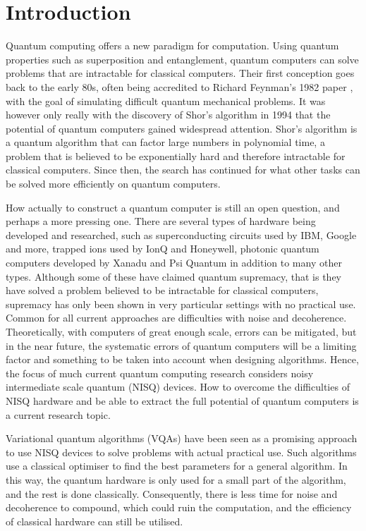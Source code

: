 \chapter{Introduction}
Quantum computing offers a new paradigm for computation.
Using quantum properties such as superposition and entanglement, quantum computers can solve problems that are intractable for classical computers.
Their first conception goes back to the early 80s, often being accredited to Richard Feynman's 1982 paper \cite{feynman1982}, with the goal of simulating difficult quantum mechanical problems.
It was however only really with the discovery of Shor's algorithm in 1994 \cite{shor1994} that the potential of quantum computers gained widespread attention.
Shor's algorithm is a quantum algorithm that can factor large numbers in polynomial time, a problem that is believed to be exponentially hard and therefore intractable for classical computers.
Since then, the search has continued for what other tasks can be solved more efficiently on quantum computers.

How actually to construct a quantum computer is still an open question, and perhaps a more pressing one.
There are several types of hardware being developed and researched, such as superconducting circuits used by IBM, Google and more, trapped ions used by IonQ and Honeywell, photonic quantum computers developed by Xanadu and Psi Quantum in addition to many other types.
Although some of these have claimed quantum supremacy, that is they have solved a problem believed to be intractable for classical computers, supremacy has only been shown in very particular settings with no practical use.
Common for all current approaches are difficulties with noise and decoherence.
Theoretically, with computers of great enough scale, errors can be mitigated, but in the near future, the systematic errors of quantum computers will be a limiting factor and something to be taken into account when designing algorithms.
Hence, the focus of much current quantum computing research considers noisy intermediate scale quantum (NISQ) devices.
How to overcome the difficulties of NISQ hardware and be able to extract the full potential of quantum computers is a current research topic.

Variational quantum algorithms (VQAs) have been seen as a promising approach to use NISQ devices to solve problems with actual practical use.
Such algorithms use a classical optimiser to find the best parameters for a general algorithm.
In this way, the quantum hardware is only used for a small part of the algorithm, and the rest is done classically.
Consequently, there is less time for noise and decoherence to compound, which could ruin the computation, and the efficiency of classical hardware can still be utilised.

